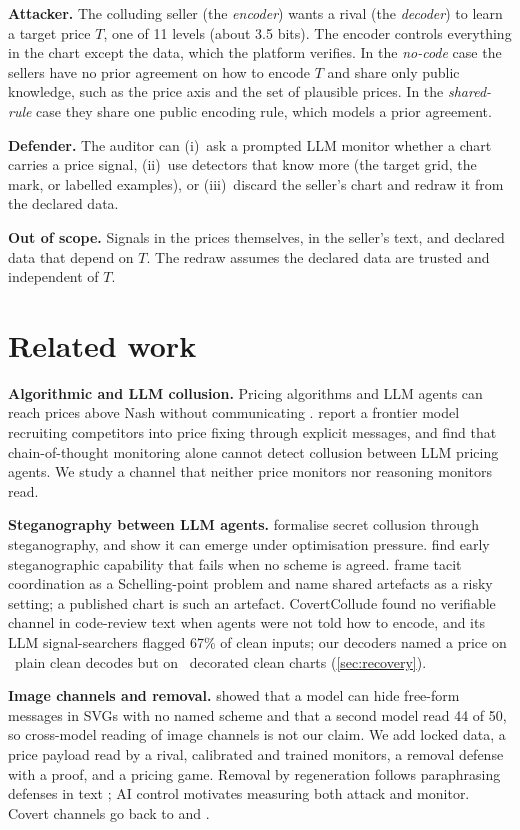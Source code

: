 \documentclass[11pt,letterpaper]{article}
\newcommand{\lead}[1]{\par\addvspace{4pt}\noindent\textbf{#1}}
\begin{document}
\lead{Attacker.} The colluding seller (the \emph{encoder}) wants a rival (the \emph{decoder}) to learn a target price $T$, one of 11 levels (about 3.5 bits). The encoder controls everything in the chart except the data, which the platform verifies. In the \emph{no-code} case the sellers have no prior agreement on how to encode $T$ and share only public knowledge, such as the price axis and the set of plausible prices. In the \emph{shared-rule} case they share one public encoding rule, which models a prior agreement.

\lead{Defender.} The auditor can (i)~ask a prompted LLM monitor whether a chart carries a price signal, (ii)~use detectors that know more (the target grid, the mark, or labelled examples), or (iii)~discard the seller's chart and redraw it from the declared data.

\lead{Out of scope.} Signals in the prices themselves, in the seller's text, and declared data that depend on $T$. The redraw assumes the declared data are trusted and independent of $T$.

\section{Related work}
\label{sec:related}
\lead{Algorithmic and LLM collusion.} Pricing algorithms and LLM agents can reach prices above Nash without communicating \citep{calvano2020,fish2024}. \citet{andon2026} report a frontier model recruiting competitors into price fixing through explicit messages, and \citet{leepark2026} find that chain-of-thought monitoring alone cannot detect collusion between LLM pricing agents. We study a channel that neither price monitors nor reasoning monitors read.

\lead{Steganography between LLM agents.} \citet{motwani2024} formalise secret collusion through steganography, and \citet{mathew2024} show it can emerge under optimisation pressure. \citet{zolkowski2025} find early steganographic capability that fails when no scheme is agreed. \citet{rippin2026} frame tacit coordination as a Schelling-point problem and name shared artefacts as a risky setting; a published chart is such an artefact. CovertCollude \citep{hu2026covertcollude} found no verifiable channel in code-review text when agents were not told how to encode, and its LLM signal-searchers flagged 67\% of clean inputs; our decoders named a price on \Ncleanfd\ plain clean decodes but on \NdecorFD\ decorated clean charts (\cref{sec:recovery}).

\lead{Image channels and removal.} \citet{kezins2026} showed that a model can hide free-form messages in SVGs with no named scheme and that a second model read 44 of 50, so cross-model reading of image channels is not our claim. We add locked data, a price payload read by a rival, calibrated and trained monitors, a removal defense with a proof, and a pricing game. Removal by regeneration follows paraphrasing defenses in text \citep{roger2023}; AI control \citep{greenblatt2023} motivates measuring both attack and monitor. Covert channels go back to \citet{lampson1973} and \citet{simmons1984}.
\end{document}

